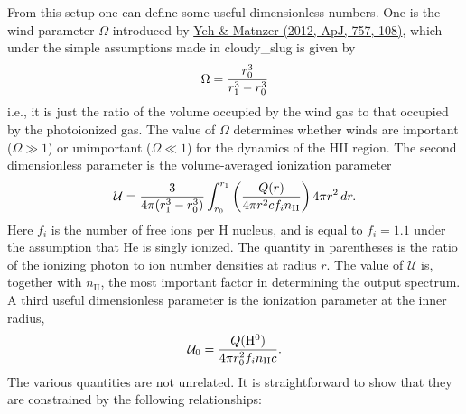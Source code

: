 \documentclass[letterpaper,10pt,english]{sphinxmanual}
\begin{document}
From this setup one can define some useful dimensionless numbers. One
is the wind parameter \(\Omega\) introduced by \href{http://adsabs.harvard.edu/abs/2012ApJ...757..108Y}{Yeh \&
Matnzer (2012, ApJ, 757, 108)}, which under the
simple assumptions made in cloudy\_slug is given by
\begin{gather}
\begin{split}\Omega = \frac{r_0^3}{r_1^3-r_0^3}\end{split}\notag
\end{gather}
i.e., it is just the ratio of the volume occupied by the wind gas to
that occupied by the photoionized gas. The value of \(\Omega\)
determines whether winds are important (\(\Omega \gg 1\)) or
unimportant (\(\Omega \ll 1\)) for the dynamics of the HII
region. The second dimensionless parameter is the volume-averaged
ionization parameter
\begin{gather}
\begin{split}\mathcal{U} = \frac{3}{4\pi (r_1^3-r_0^3)} \int_{r_0}^{r_1}
\left(\frac{Q(r)}{4\pi r^2 c f_i n_{\mathrm{II}}}\right)
4\pi r^2 \, dr.\end{split}\notag
\end{gather}
Here \(f_i\) is the number of free ions per H nucleus, and is
equal to \(f_i = 1.1\) under the assumption that He is singly
ionized. The quantity in parentheses is the ratio of the ionizing
photon to ion number densities at radius \(r\). The value of
\(\mathcal{U}\) is, together with \(n_{\mathrm{II}}\), the
most important factor in determining the output spectrum. A third
useful dimensionless parameter is the ionization parameter at the
inner radius,
\begin{gather}
\begin{split}\mathcal{U}_0 = \frac{Q(\mathrm{H}^0)}
{4\pi r_0^2 f_i n_{\mathrm{II}} c}.\end{split}\notag
\end{gather}
The various quantities are not unrelated. It is straightforward to
show that they are constrained by the following relationships:
\end{document}
